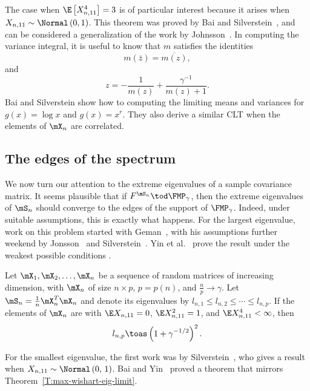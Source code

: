 \noindent
The case when $\E\left[ X_{n,11}^4 \right] = 3$ is of particular interest
because it arises when $X_{n,11} \sim \Normal\left( 0, 1 \right)$.
This theorem was proved by Bai and Silverstein~\cite{bai2004clt}, and can
be considered a generalization of the work by Johnsson~\cite{jonsson1982slt}.
In computing the variance integral, it is useful to know that $m$ satisfies
the identities 
\[
    m(\bar z) = \overline{m (z) },
\]
and
\[
    z = - \frac{1}{m(z)} + \frac{\gamma^{-1}}{m(z) + 1}.
\]
Bai and Silverstein show how to computing the limiting means and variances
for $g(x) = \log x$ and $g(x) = x^r$.  They also derive a similar CLT when
the elements of $\mX_n$ are correlated.


\subsection{The edges of the spectrum}

We now turn our attention to the extreme eigenvalues of a sample covariance
matrix.  It seems plausible that if $F^{\mS_n} \tod \FMP_\gamma$, then the
extreme eigenvalues of $\mS_n$ should converge to the edges of the support
of $\FMP_\gamma$.  Indeed, under suitable assumptions, this is exactly what
happens.  For the largest eigenvalue, work on this problem started with Geman~\cite{geman1980ltn}, with his assumptions further weekend by Jonsson~\cite{jonsson1983ole} and Silverstein~\cite{silverstein1984ole}.
Yin et al.~\cite{yin1988lle} prove the result under the weakest possible
conditions \cite{bai1988nle}.

\begin{theorem}\label{T:max-wishart-eig-limit}
    Let $\mX_1, \mX_2, \ldots, \mX_n$ be a sequence of random matrices of
    increasing dimension, with $\mX_n$ of size $n \times p$, $p = p(n)$, and
    $\frac{n}{p} \to \gamma$.  Let $\mS_n = \frac{1}{n} \mX_n^T \mX_n$ and 
    denote its eigenvalues by 
    $l_{n,1} \leq l_{n,2} \leq \cdots \leq l_{n,p}$.  If the 
    elements of $\mX_n$ are 
    \iid with $\E X_{n,11} = 0$, $\E X_{n,11}^2 = 1$, and
    $\E X_{n,11}^4 < \infty$, then
    \[
        l_{n,p} \toas \left( 1 + \gamma^{-1/2} \right)^2.
    \]
\end{theorem}

For the smallest eigenvalue, the first work was by Silverstein~\cite{silverstein1985sel}, who gives a result when 
$X_{n,11} \sim \Normal\left( 0,\, 1 \right)$.  Bai and Yin~\cite{bai1993lse} proved a theorem that mirrors Theorem~\ref{T:max-wishart-eig-limit}.

